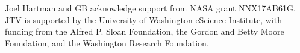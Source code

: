 \documentclass[apj]{emulateapj}
\begin{document}
\begin{acknowledgements}
Joel Hartman and GB acknowledge support from NASA grant NNX17AB61G. JTV is supported by the University of Washington eScience Institute, with funding from the Alfred P. Sloan Foundation, the Gordon and Betty Moore Foundation, and the Washington Research Foundation.
\end{acknowledgements}



\end{document}
